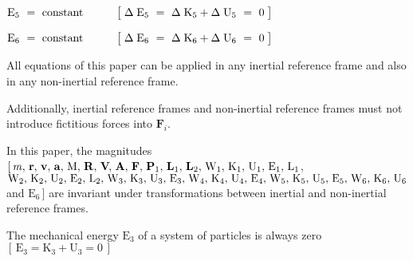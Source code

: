 \documentclass[10pt]{article}
\newcommand{\spc}{\hspace{+0.150em}}
\begin{document}
\par \bigskip\medskip ${\mathrm{E}}_5 ~=~ {\mathrm{constant}} \hspace{+3.00em} \big [ \; \Delta \; {\mathrm{E}}_5 ~=~ \Delta \; {\mathrm{K}}_5 + \Delta \; {\mathrm{U}}_5 ~=~ 0 \; \big ]$

\par \bigskip ${\mathrm{E}}_6 ~=~ {\mathrm{constant}} \hspace{+3.00em} \big [ \; \Delta \; {\mathrm{E}}_6 ~=~ \Delta \; {\mathrm{K}}_6 + \Delta \; {\mathrm{U}}_6 ~=~ 0 \; \big ]$

\newpage

\par {}

\par \bigskip\smallskip \noindent All equations of this paper can be applied in any inertial reference frame and also in any non-inertial reference frame.

\par \bigskip\smallskip \noindent Additionally, inertial reference frames and non-inertial reference frames must not introduce fictitious forces into ${\mathbf{F}}_i$.

\par \bigskip\smallskip \noindent In this paper, the magnitudes $[ \, {\mathit{m}},\spc {\mathbf{r}},\spc {\mathbf{v}},\spc {\mathbf{a}},\spc {\mathrm{M}},\spc {\mathbf{R}},\spc {\mathbf{V}}\hspace{-0.120em},\spc {\mathbf{A}},\spc {\mathbf{F}},\spc {\mathbf{P}}_1,\spc {\mathbf{L}}_1,\spc {\mathbf{L}}_2,\spc {\mathrm{W}}_1,\spc {\mathrm{K}}_1,\spc {\mathrm{U}}_1,\spc {\mathrm{E}}_1,\spc {\mathrm{L}}_1$, ${\mathrm{W}}_2,\spc {\mathrm{K}}_2,\spc {\mathrm{U}}_2,\spc {\mathrm{E}}_2,\spc {\mathrm{L}}_2,\spc {\mathrm{W}}_3,\spc {\mathrm{K}}_3,\spc {\mathrm{U}}_3,\spc {\mathrm{E}}_3,\spc {\mathrm{W}}_4,\spc {\mathrm{K}}_4,\spc {\mathrm{U}}_4,\spc {\mathrm{E}}_4,\spc {\mathrm{W}}_5,\spc {\mathrm{K}}_5,\spc {\mathrm{U}}_5,\spc {\mathrm{E}}_5,\spc {\mathrm{W}}_6,\spc {\mathrm{K}}_6,\spc {\mathrm{U}}_6$ and ${\mathrm{E}}_6 \, ]$ are invariant under transformations between inertial and non-inertial reference frames.

\par \bigskip\smallskip \noindent The mechanical energy ${\mathrm{E}}_3$ of a system of particles is always zero $[ \, {\mathrm{E}}_3 = {\mathrm{K}}_3 + {\mathrm{U}}_3 = 0 \, ]$
\end{document}
